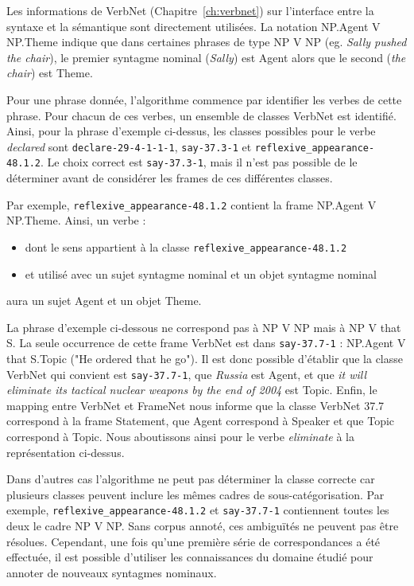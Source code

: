 Les informations de VerbNet (Chapitre~\ref{ch:verbnet}) sur l'interface entre
la syntaxe et la sémantique sont directement utilisées. La notation NP.Agent V
NP.Theme indique que dans certaines phrases de type NP V NP (eg. \emph{Sally
pushed the chair}), le premier syntagme nominal (\emph{Sally}) est Agent alors
que le second (\emph{the chair}) est Theme.

Pour une phrase donnée, l'algorithme commence par identifier les verbes de
cette phrase. Pour chacun de ces verbes, un ensemble de classes VerbNet est
identifié. Ainsi, pour la phrase d'exemple ci-dessus, les classes possibles
pour le verbe \textit{declared} sont \texttt{declare-29-4-1-1-1},
\texttt{say-37.3-1} et \texttt{reflexive\_appearance-48.1.2}. Le choix correct
est \texttt{say-37.3-1}, mais il n'est pas possible de le déterminer avant de
considérer les frames de ces différentes classes.

Par exemple, \texttt{reflexive\_appearance-48.1.2} contient la frame NP.Agent V
NP.Theme. Ainsi, un verbe :
\begin{itemize}
    \item dont le sens appartient à la classe \texttt{reflexive\_appearance-48.1.2}
    \item et utilisé avec un sujet syntagme nominal et un objet syntagme nominal
\end{itemize}
aura un sujet Agent et un objet Theme.

La phrase d'exemple ci-dessous ne correspond pas à NP V NP mais à NP V that S.
La seule occurrence de cette frame VerbNet est dans \texttt{say-37.7-1} :
NP.Agent V that S.Topic ("He ordered that he go"). Il est donc possible
d'établir que la classe VerbNet qui convient est \texttt{say-37.7-1}, que
\emph{Russia} est Agent, et que \textit{it will eliminate its tactical nuclear
weapons by the end of 2004} est Topic. Enfin, le mapping entre VerbNet et
FrameNet nous informe que la classe VerbNet 37.7 correspond à la frame
Statement, que Agent correspond à Speaker et que Topic correspond à Topic.
Nous aboutissons ainsi pour le verbe \emph{eliminate} à la représentation
ci-dessus.

Dans d'autres cas l'algorithme ne peut pas déterminer la classe correcte car
plusieurs classes peuvent inclure les mêmes cadres de sous-catégorisation. Par
exemple, \texttt{reflexive\_appearance-48.1.2} et \texttt{say-37.7-1}
contiennent toutes les deux le cadre NP V NP. Sans corpus annoté, ces
ambiguïtés ne peuvent pas être résolues. Cependant, une fois qu'une première
série de correspondances a été effectuée, il est possible d'utiliser les
connaissances du domaine étudié pour annoter de nouveaux syntagmes nominaux.

